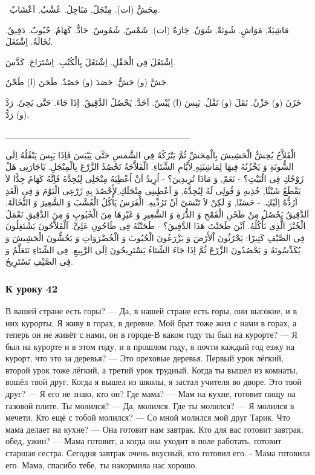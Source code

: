 \documentclass[a5paper]{article}
\begin{document}
\ مِحَشٌّ (ات). مِنْجَلٌ, مَنَاجِلُ. عُشْبٌ, اَعْشَابٌ. 

مَاشِيَةٌ, مَوَاشٍ. شُونَةٌ, شُوَنٌ. جَارَةٌ (ات). شَمْسٌ, شُمُوسٌ. حَادٌّ. كَهَامٌ. حُبُوبٌ. دَقِيقٌ. نُخَالَةٌ. اِشْتَغَلَ. 

اِشْتَغَلَ فِى الْحَقْلِ. اِشْتَغَلَ بِالْكُتُبِ. اِسْتَرَاحَ. كَدَّسَ. 

حَشَّ (و) حَشٌّ. حَصَدَ (و) حَصْدٌ. طَحَنَ (ا) طَحْنٌ. 

خَزَنَ (و) خَزْنٌ. نَقَلَ (و) نَقْلٌ. يَبِسَ (ا) يُبْسٌ. اَحَدَّ. يَحْصُلُ الدَّقِيقُ. اِذَا جَاءَ. حَتَّى يَجِئَ. رَدَّ (و) رَدٌّ.

\_\_\_\_\_\_\_\_\_\_\_\_\_\_\_\_\_\_\_\_\_\_\_\_\_\_\_\_\_

الْفَلاَّحُ يُحِشُّ الْحَشِيشَ بِالْمِحَشِّ ثُمَّ يَتْرُكُهُ فِى الشَّمسِ حَتَّى يَيْبَسَ فَاِذَا يَبِسَ يَنْقُلُهُ اِلَى الشُّونَةِ وَ يَخْزُنُهُ فِيهَا لِمَاشِيَتِهِ ِلأَيَّامِ الشِّتَاءِ. الْفَلاَّحَةُ تَحْصُدُ الزَّرْعَ بِالْمِنْجَلِ. يَاجَارَتِى هَلْ زَوْجُكِ فِى الْبَيْتِ؟ - نَعَمْ, وَ مَاذَا تُرِيدِينَ؟ - اُرِيدُ اَنْ اُعْطِيَهُ مِنْجَلِى لِيُحِدَّهُ فَاِنَّهُ كَهَامٌ جِدًّا لاَ يَقْطَعُ شَيْئًا, خُذِيهِ وَ قُولِى لَهُ لِيُحِدَّهُ, وَ اَعْطِينِى مِنْجَلَكِ ِلأَحْصُدَ بِهِ زَرْعِى الْيَوْمَ وَ فِى الْغَدِ اَرُدُّهُ اِلَيْكِ. - حَسَنًا, وَ لَكِنْ لاَ تَنْسَىْ اَنْ تَرُدِّيهِ. الْفَرَسُ يَأْكُلُ الْعُشْبَ وَ الشَّعِيرَ وَ النُّخَالَةَ. اَلدَّقِيقُ يَحْصُلُ مِنْ طَحْنِ الْقَمْحِ وَ الذُّرَةِ وَ الشَّعِيرِ وَ غَيْرِهَا مِنَ الْحُبُوبِ وَ مِنَ الدَّقِيقِ نَعْمَلُ الْخُبْزَ الَّذِى نَأْكُلُهُ. اَيْنَ طَحَنْتَ هَذَا الدَّقِيقَ؟ - طَحَنْتُهُ فِى طَاحُونِ عَلِىٍّ. اَلْفَلاَّحُونَ يَشْتَغِلُونَ فِى الصَّيْفِ كَثِيرًا: يَحْرُثُونَ اْلأَرْضَ وَ يَزْرَعُونَ الْحُبُوبَ وَ الْخُضْرَوَاتِ وَ يَحُشُّونَ الْحَشِيشَ وَ يُكَدِّسُونَهُ وَ يَحْصُدُونَ الزَّرْعَ ثُمَّ اِذَا جَاءَ الشِّتَاءُ يَسْتَرِيحُونَ اِلَى الرَّبِيعِ. فِى الشِّتَاءِ نَتَعَلَّمُ وَ فِى الصَّيْفِ نَسْتَرِيحُ.

\subsubsection{К уроку 42}
В вашей стране есть горы? — Да, в нашей стране есть горы, они высокие, и в них курорты. Я живу в горах, в деревне. Мой брат тоже жил с нами в горах, а теперь он не живёт с нами, он в городе-В каком году ты был на курорте? — Я был на курорте и в этом году, и в прошлом году, я почти каждый год езжу на курорт, что это за деревья? — Это ореховые деревья. Первый урок лёгкий, второй урок тоже лёгкий, а третий урок трудный. Когда ты вышел из комнаты, вошёл твой друг. Когда я вышел из школы, я застал учителя во дворе. Это твой друг? — Я его не знаю, кто он? Где мама? — Мам на кухне, готовит пищу на газовой плите. Ты молился? — Да, молился. Где ты молился? — Я молился в мечети. Кто ещё с тобой молился? — Со мной молился мой друг Тарик. Что мама делает на кухне? — Она готовит нам завтрак. Кто для вас готовит завтрак, обед, ужин? — Мама готовит, а когда она уходит в поле работать, готовит старшая сестра. Сегодня завтрак очень вкусный, кто готовил его. - Мама готовила его. Мама, спасибо тебе, ты накормила нас хорошо.
\end{document}
